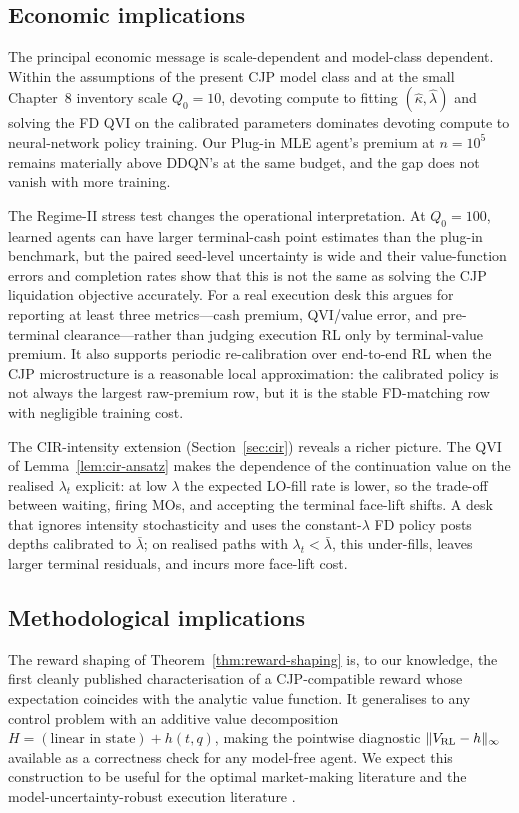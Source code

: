 \documentclass[]{interact}
\theoremstyle{plain}
\theoremstyle{definition}
\theoremstyle{remark}
\newcommand{\1}[1]{\mathbf{1}_{\{#1\}}}
\begin{document}
\subsection{Economic implications}\label{sec:econ-implications}
The principal economic message is scale-dependent and model-class dependent. Within the assumptions of the present CJP model class and at the small Chapter~8 inventory scale $Q_0=10$, devoting compute to fitting $(\hat\kappa, \hat\lambda)$ and solving the FD QVI on the calibrated parameters dominates devoting compute to neural-network policy training. Our Plug-in MLE agent's premium at $n = 10^5$ remains materially above DDQN's at the same budget, and the gap does not vanish with more training.

The Regime-II stress test changes the operational interpretation. At $Q_0=100$, learned agents can have larger terminal-cash point estimates than the plug-in benchmark, but the paired seed-level uncertainty is wide and their value-function errors and completion rates show that this is not the same as solving the CJP liquidation objective accurately. For a real execution desk this argues for reporting at least three metrics---cash premium, QVI/value error, and pre-terminal clearance---rather than judging execution RL only by terminal-value premium. It also supports periodic re-calibration over end-to-end RL when the CJP microstructure is a reasonable local approximation: the calibrated policy is not always the largest raw-premium row, but it is the stable FD-matching row with negligible training cost.

The CIR-intensity extension (Section~\ref{sec:cir}) reveals a richer picture. The QVI of Lemma~\ref{lem:cir-ansatz} makes the dependence of the continuation value on the realised $\lambda_t$ explicit: at low $\lambda$ the expected LO-fill rate is lower, so the trade-off between waiting, firing MOs, and accepting the terminal face-lift shifts. A desk that ignores intensity stochasticity and uses the constant-$\lambda$ FD policy posts depths calibrated to $\bar\lambda$; on realised paths with $\lambda_t<\bar\lambda$, this under-fills, leaves larger terminal residuals, and incurs more face-lift cost.

\subsection{Methodological implications}\label{sec:method-implications}
The reward shaping of Theorem~\ref{thm:reward-shaping} is, to our knowledge, the first cleanly published characterisation of a CJP-compatible reward whose expectation coincides with the analytic value function. It generalises to any control problem with an additive value decomposition $H = (\text{linear in state}) + h(t, q)$, making the pointwise diagnostic $\|V_{\rm RL} - h\|_\infty$ available as a correctness check for any model-free agent. We expect this construction to be useful for the optimal market-making literature \citep{avellanedastoikov2008, gueant2012inventory, spooner2018mm} and the model-uncertainty-robust execution literature \citep{cartea2017uncertainty}.
\end{document}
